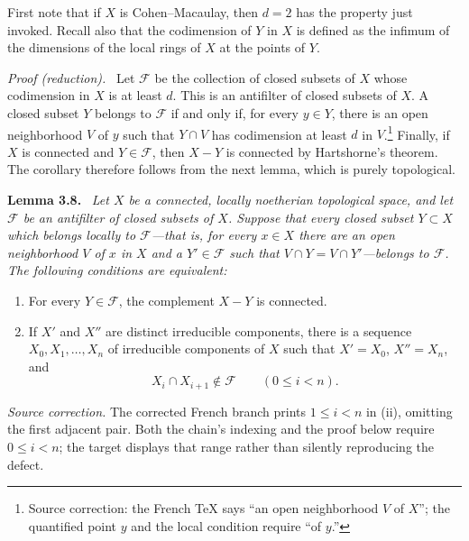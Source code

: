 \documentclass[11pt,a4paper,oneside]{book}
\providecommand{\srcpage}[1]{%
  \marginpar{\raggedright\scriptsize\color{gray}Original French p.~#1}}
\newenvironment{sgastatement}[1]
  {\par\addvspace{0.8\baselineskip}\noindent\textbf{#1.}\ \itshape}
  {\par\addvspace{0.35\baselineskip}}
\newenvironment{proofbridge}
  {\par\noindent\textit{Proof (reduction).}\ }
  {\par}
\theoremstyle{plain}
\theoremstyle{definition}
\theoremstyle{remark}
\begin{document}
First note\srcpage{39} that if $X$ is Cohen--Macaulay, then $d=2$ has the
property just invoked. Recall also that the codimension of $Y$ in $X$ is
defined as the infimum of the dimensions of the local rings of $X$ at the
points of $Y$.

\begin{proofbridge}
Let $\mathcal F$ be the collection of closed subsets of $X$ whose codimension
in $X$ is at least $d$. This is an antifilter of closed subsets of $X$. A
closed subset $Y$ belongs to $\mathcal F$ if and only if, for every $y\in Y$,
there is an open neighborhood $V$ of $y$ such that $Y\cap V$ has codimension
at least $d$ in $V$.\footnote{Source correction: the French TeX says “an open
neighborhood $V$ of $X$”; the quantified point $y$ and the local condition
require “of $y$.\!”} Finally, if $X$ is connected and $Y\in\mathcal F$, then
$X-Y$ is connected by Hartshorne's theorem. The corollary therefore follows
from the next lemma, which is purely topological.
\end{proofbridge}


\begin{sgastatement}{Lemma 3.8}
Let $X$ be a connected, locally noetherian topological space, and let
$\mathcal F$ be an antifilter of closed subsets of $X$. Suppose that every
closed subset $Y\subset X$ which belongs locally to $\mathcal F$---that is,
for every $x\in X$ there are an open neighborhood $V$ of $x$ in $X$ and a
$Y'\in\mathcal F$ such that $V\cap Y=V\cap Y'$---belongs to $\mathcal F$.
The following conditions are equivalent:
\begin{enumerate}[label=\textup{(\roman*)},leftmargin=2.7em]
\item For every $Y\in\mathcal F$, the complement $X-Y$ is connected.
\item If $X'$ and $X''$ are distinct irreducible components, there is a
sequence $X_0,X_1,\ldots,X_n$ of irreducible components of $X$ such that
$X'=X_0$, $X''=X_n$, and
\[
  X_i\cap X_{i+1}\notin\mathcal F\qquad(0\le i<n).
\]
\end{enumerate}
\end{sgastatement}

\noindent\textit{Source correction.} The corrected French branch prints
$1\le i<n$ in (ii), omitting the first adjacent pair. Both the chain's
indexing and the proof below require $0\le i<n$; the target displays that
range rather than silently reproducing the defect.
\end{document}
